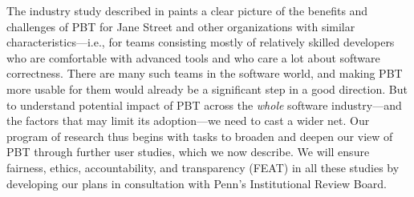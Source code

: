 




The industry study described in  paints a clear
picture of the benefits and challenges of PBT for
Jane Street and other organizations with similar
characteristics---i.e., for teams consisting mostly
of relatively skilled developers who are comfortable with
advanced tools and who care a lot about
software correctness.  There are many such teams in the software
world, and making PBT more
usable for them would already be a significant step in a good
direction.  But to
understand potential impact of PBT
across the {\em  whole} software
industry---and the factors that may limit its adoption---we need to
cast a wider net.
%
Our program of research thus begins with tasks to broaden and deepen
our view of PBT through further user studies, which we now describe.
We will ensure
fairness, ethics, accountability, and transparency (FEAT) in all these
studies by developing our plans in consultation with Penn's
Institutional Review Board.

